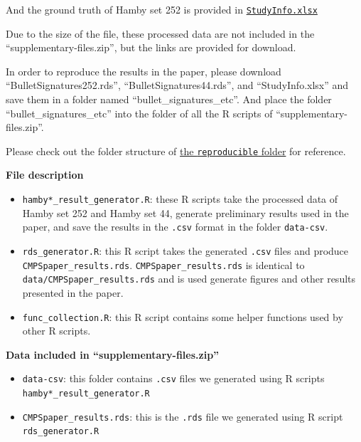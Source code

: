 And the ground truth of Hamby set 252 is provided in
\href{https://github.com/willju-wangqian/CMPSpaper/blob/main/reproducible/bullet_signatures_etc/StudyInfo.xlsx}{\texttt{StudyInfo.xlsx}}

Due to the size of the file, these processed data are not included in
the ``supplementary-files.zip'', but the links are provided for
download.

In order to reproduce the results in the paper, please download
``BulletSignatures252.rds'', ``BulletSignatures44.rds'', and
``StudyInfo.xlsx'' and save them in a folder named
``bullet\_signatures\_etc''. And place the folder
``bullet\_signatures\_etc'' into the folder of all the R scripts of
``supplementary-files.zip''.

Please check out the folder structure of
\href{https://github.com/willju-wangqian/CMPSpaper/tree/main/reproducible}{the
\texttt{reproducible} folder} for reference.

\textbf{File description}

\begin{itemize}
\tightlist
\item
  \texttt{hamby*\_result\_generator.R}: these R scripts take the
  processed data of Hamby set 252 and Hamby set 44, generate preliminary
  results used in the paper, and save the results in the \texttt{.csv}
  format in the folder \texttt{data-csv}.
\item
  \texttt{rds\_generator.R}: this R script takes the generated
  \texttt{.csv} files and produce \texttt{CMPSpaper\_results.rds}.
  \texttt{CMPSpaper\_results.rds} is identical to
  \texttt{data/CMPSpaper\_results.rds} and is used generate figures and
  other results presented in the paper.
\item
  \texttt{func\_collection.R}: this R script contains some helper
  functions used by other R scripts.
\end{itemize}

\textbf{Data included in ``supplementary-files.zip''}

\begin{itemize}
\tightlist
\item
  \texttt{data-csv}: this folder contains \texttt{.csv} files we
  generated using R scripts \texttt{hamby*\_result\_generator.R}
\item
  \texttt{CMPSpaper\_results.rds}: this is the \texttt{.rds} file we
  generated using R script \texttt{rds\_generator.R}
\end{itemize}

